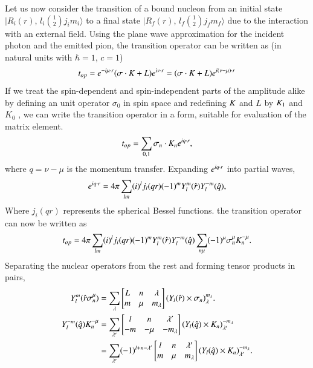 Let us now consider the transition of a bound nucleon from an initial state $|R_i (r)$, $l_i \binom{1}{2} j_i m_i \rangle$ to a final state $|R_f (r)$, $l_f \binom{1}{2} j_f m_f \rangle$ due to the interaction with an external field. Using the plane wave approximation for the incident photon and the emitted pion, the transition operator can be written as (in natural units with $\hbar =1$, $c=1$)
\setcounter{equation}{36}
\begin{equation}
  t_{op}= e^{-i {\boldmath  \mu \cdot r}} ({\boldmath  \sigma \cdot K} + L)e^{i {\boldmath  \nu \cdot r}}= ({\boldmath  \sigma \cdot K}+ L) e^{i ({\boldmath  \nu - \mu})\cdot {\boldmath  r}} \label{chap3-eq37}
\end{equation}
If we treat the spin-dependent and spin-independent parts of the amplitude alike by defining an unit operator $\sigma_0$ in spin space and redefining ${\boldmath  K}$ and $L$ by ${\boldmath  K_1}$ and $K_0$ , we can write the transition operator in a form, suitable for evaluation of the matrix element.
\begin{align}
  t_{op} = \sum_{0, 1} \sigma_n \cdot {\boldmath  K}_n e^{i{\boldmath  q \cdot r}}, \label{chap3-eq38}
\end{align}
where $q= \nu- \mu$ is the momentum transfer. Expanding $e^{i {\boldmath  q \cdot r}}$ into partial waves,
\begin{equation}
  e^{i {\boldmath  q \cdot r}} = 4 \pi \sum_{lm} (i)^l j_l (qr) (-1)^{m}Y_l^m (\hat{{\boldmath  r}}) Y_l^{-m} (\hat{{\boldmath  q}}), \label{chap3-eq39}
\end{equation}
Where $j_i (qr)$ represents the spherical Bessel functions. the transition operator can now be written as
\begin{equation}
 t_{op}= 4 \pi \sum_{lm} (i)^l j_i (qr) (-1)^m Y_l^m (\hat{{\boldmath  r}}) Y_l^{-m} (\hat{{\boldmath  q}}) \sum_{n\mu} (-1)^\mu {\boldmath \sigma}_n^\mu {\boldmath K}_n^{-\mu}. \label{chap3-eq40}
\end{equation}
Separating the nuclear operators from the rest and forming tensor products in pairs,
\begin{align}
  Y_l^m ({\boldmath \hat{r}} {\boldmath \sigma}_n^\mu) & = \sum_{\lambda}
  \begin{bmatrix} L & n & \lambda\\ m & \mu & m_\lambda \end{bmatrix} (Y_l ({\boldmath \hat{r}}) \times {\boldmath \sigma_n})_\lambda^{m_\lambda}. \label{chap3-eq41}\\
  Y_l^{-m} ({\boldmath \hat{q}}) {\boldmath K}_n^{-\mu} & = \sum_{\lambda'}
  \begin{bmatrix}    l & n & \lambda' \\ -m & -\mu & -m_\lambda  \end{bmatrix}
  (Y_l ({\boldmath \hat{q}}) \times {\boldmath K}_n)_{\lambda'}^{-m_\lambda} \notag \\
  & = \sum_{\lambda '} (-1)^{l + n - \lambda'}
  \begin{bmatrix}    l & n & \lambda'\\ m & \mu & m_\lambda  \end{bmatrix}
  (Y_l ({\boldmath \hat{q}}) \times {\boldmath K}_n)_{\lambda'}^{-m_\lambda}. \label{chap3-eq42}
\end{align}

